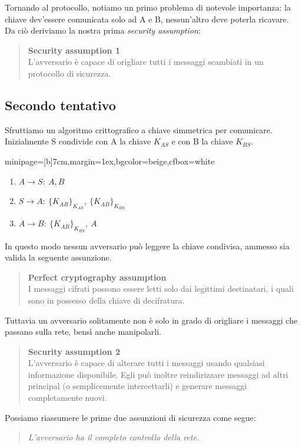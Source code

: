 \documentclass[a4paper, 11pt, notitlepage, fleqn]{report}
\newcommand{\fromto}[2]{#1\rightarrow #2\!:\ }
\newenvironment{colbox}[2]%
{%
	\par\noindent\hspace{10pt}
	\begin{adjustbox}{minipage=[b]{#2},margin=1ex,bgcolor=#1,cfbox=white}
}{%
	\end{adjustbox}\newline%
}
\begin{document}
Tornando al protocollo, notiamo un primo problema di notevole importanza: la chiave dev'essere comunicata solo ad A e B, nessun'altro deve poterla ricavare. Da ciò deriviamo la nostra prima \emph{security assumption}:
\begin{quote}
	\textbf{Security assumption 1}\\
	L'avversario è capace di origliare tutti i messaggi scambiati in un protocollo di sicurezza.
\end{quote}

\subsection{Secondo tentativo}
Sfruttiamo un algoritmo crittografico a chiave simmetrica per comunicare. Inizialmente S condivide con A la chiave $K_{AS}$ e con B la chiave $K_{BS}$.
\begin{colbox}{beige}{7cm}
	\begin{enumerate}
		\item $\fromto{A}{S}A, B$
		\item $\fromto{S}{A}\{K_{AB}\}_{K_{AS}},\ \{K_{AB}\}_{K_{BS}}$
		\item $\fromto{A}{B}\{K_{AB}\}_{K_{BS}},\ A$
	\end{enumerate}
\end{colbox}
In questo modo nessun avversario può leggere la chiave condivisa, ammesso sia valida la seguente assunzione.
\begin{quote}
	\textbf{Perfect cryptography assumption}\\
	I messaggi cifrati possono essere letti solo dai legittimi destinatari, i quali sono in possesso della chiave di decifratura.
\end{quote}
Tuttavia un avversario solitamente non è solo in grado di origliare i messaggi che passano sulla rete, bensì anche manipolarli.
\begin{quote}
	\textbf{Security assumption 2}\\
	L'avversario è capace di alterare tutti i messaggi usando qualsiasi informazione disponibile. Egli può inoltre reindirizzare messaggi ad altri principal (o semplicemente intercettarli) e generare messaggi completamente nuovi.
\end{quote}
Possiamo riassumere le prime due assunzioni di sicurezza come segue:
\begin{quote}
	\emph{L'avversario ha il completo controllo della rete.}
\end{quote}
\end{document}
